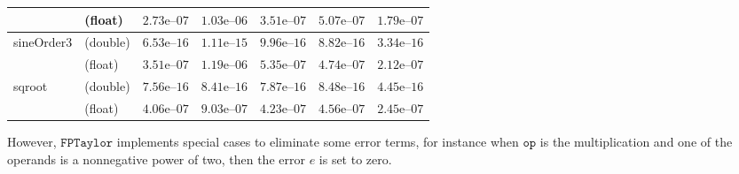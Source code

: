 \documentclass[preprint]{sigplanconf}
\newcommand{\op}{\mathtt{op}}
\newcommand{\fptaylor}{\mathtt{FPTaylor}}
\theoremstyle{plain}
\begin{document}
\begin{table*}[!ht]
\begin{center}
\begin{tabular}{p{2.3cm}lccccc}
& (float) & $2.73\text{e--}07$ & $1.03\text{e--}06$ & $3.51\text{e--}07$ & $5.07\text{e--}07$ & $1.79\text{e--}07$\\
\hline
\multirow{2}{*}{sineOrder3}
& (double) & $6.53\text{e--}16$ & $1.11\text{e--}15$ & $9.96\text{e--}16$ & $8.82\text{e--}16$ & $3.34\text{e--}16$\\
& (float) & $3.51\text{e--}07$ & $1.19\text{e--}06$ & $5.35\text{e--}07$ & $4.74\text{e--}07$ & $2.12\text{e--}07$\\
\hline
\multirow{2}{*}{sqroot}
& (double) & $7.56\text{e--}16$ & $8.41\text{e--}16$ & $7.87\text{e--}16$ & $8.48\text{e--}16$ & $4.45\text{e--}16$\\
& (float) & $4.06\text{e--}07$ & $9.03\text{e--}07$ & $4.23\text{e--}07$ & $4.56\text{e--}07$ & $2.45\text{e--}07$\\
\hline
\end{tabular}
\label{table:error}
\end{center}
\end{table*}


However, $\fptaylor$ implements special cases to eliminate some error terms, for instance when $\op$ is the multiplication and one of the operands is a nonnegative power of two, then the error $e$ is set to zero. 
\end{document}
